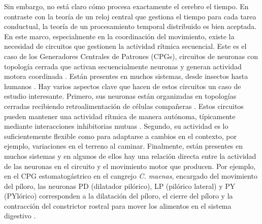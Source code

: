 Sin embargo, no está claro cómo procesa exactamente el cerebro el tiempo. En contraste con la teoría de un reloj central que gestiona el tiempo para cada tarea conductual, la teoría de un procesamiento temporal distribuido \parencite{buonomano_temporal_1995,ivry_representation_1996} es bien aceptada. En este marco, especialmente en la coordinación del movimiento, existe la necesidad de circuitos que gestionen la actividad rítmica secuencial. Este es el caso de los Generadores Centrales de Patrones (CPGs), circuitos de neuronas con topología cerrada que activan secuencialmente neuronas y generan actividad motora coordinada \parencite{selverston_reliable_2000}. Están presentes en muchos sistemas, desde insectos hasta humanos \parencite{pearson_central_1972,marder_central_2001,mackay-lyons_central_2002,minassian_human_2017}. Hay varios aspectos clave que hacen de estos circuitos un caso de estudio interesante. Primero, sus neuronas están organizadas en topologías cerradas recibiendo retroalimentación de células compañeras \parencite{huerta_topology_2001}. Estos circuitos pueden mantener una actividad rítmica de manera autónoma, típicamente mediante interacciones inhibitorias mutuas \parencite{katz_evolution_2016}. Segundo, su actividad es lo suficientemente flexible como para adaptarse a cambios en el contexto, por ejemplo, variaciones en el terreno al caminar. Finalmente, están presentes en muchos sistemas y en algunos de ellos hay una relación directa entre la actividad de las neuronas en el circuito y el movimiento motor que producen. Por ejemplo, en el CPG estomatogástrico en el cangrejo \textit{C. maenas}, encargado del movimiento del píloro, las neuronas PD (dilatador pilórico), LP (pilórico lateral) y PY (PYlórico) corresponden a la dilatación del píloro, el cierre del píloro y la contracción del constrictor rostral para mover los alimentos en el sistema digestivo \parencite{moulins_introduction_1987,selverston_oscillations_2006}.

